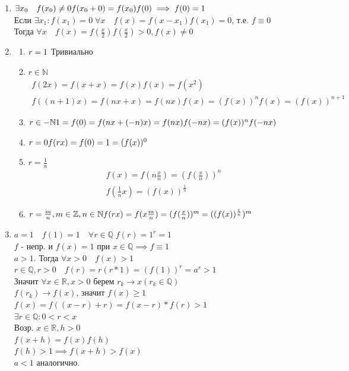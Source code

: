 \documentclass{article}
\begin{document}
\begin{enumerate}
    \item $\exists x_0 \quad f(x_0) \ne 0\\ f(x_0+0) = f(x_0) f(0) \implies f(0) = 1$\\
    Если $\exists x_1: f(x_1) = 0 \; \forall x \quad f(x) = f(x-x_1)f(x_1)=0$, т.е. $f\equiv 0$\\
    Тогда $\forall x \quad f(x) = f(\frac{x}{2})f(\frac{x}{2}) > 0, f(x) \ne 0$
    
    \item \begin{enumerate} 
        \item $r = 1 \hfill$ Тривиально
        \item $r \in \mathbb{N}$ 
        \begin{align}
        f(2x) = f(x+x) = f(x) f(x) = f(x^2)\\
        f((n+1)x)=f(nx+x)=f(nx)f(x)=(f(x))^nf(x)=(f(x))^{n+1}
        \end{align}
        
        \item $r \in -\mathbb{N} \hfill 1=f(0)=f(nx+(-n)x)=f(nx)f(-nx)=(f(x))^nf(-nx)$
        
        \item $r = 0 \hfill f(rx) = f(0) = 1 = (f(x))^0$
        
        \item $r=\frac{1}{n}$
        \begin{align}
        f(x)=f(n\frac{x}{n})=(f(\frac{x}{n}))^n\\
        f(\frac{1}{n}x)=(f(x))^{\frac{1}{n}}
        \end{align}
        
        \item $r=\frac{m}{n}, m\in \mathbb{Z}, n \in \mathbb{N} \hfill f(rx) = f(x\frac{m}{n}) = (f(\frac{x}{n}))^m=((f(x))^\frac{1}{n})^m$
    \end{enumerate}

    \item $a=1 \quad f(1)=1 \quad \forall r \in \mathbb{Q} \; f(r) = 1^r = 1$\\
    $f$ - непр. и $f(x) = 1$ при $x \in \mathbb{Q} \implies f \equiv 1$ \\
    $a > 1$. Тогда $\forall x > 0 \quad f(x) > 1$ \\
    $r \in \mathbb{Q}, r > 0 \quad f(r) = r(r*1) = (f(1))^r=a^r>1$\\
    Значит $\forall x \in \mathbb{R}, x > 0$ берем $r_k \rightarrow x(r_k \in \mathbb{Q})$\\
    $f(r_k) \rightarrow f(x)$, значит $f(x) \ge 1$\\
    $f(x) = f((x-r)+r)=f(x-r)*f(r) > 1$\\
    $\exists r \in \mathbb{Q} : 0 < r < x$\\
    Возр. $x \in \mathbb{R}, h > 0$\\
    $f(x+h) = f(x) f(h)$\\
    $f(h) > 1 \implies f(x+h) > f(x)$\\
    $a<1$ аналогично.
    

\end{enumerate}
\end{document}
